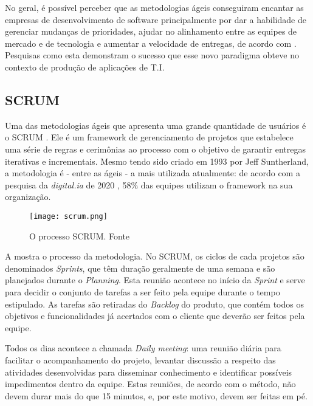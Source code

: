 No geral, é possível perceber que as metodologias ágeis conseguiram encantar as empresas de desenvolvimento de software principalmente por dar a habilidade de gerenciar mudanças de prioridades, ajudar no alinhamento entre as equipes de mercado e de tecnologia e aumentar a velocidade de entregas, de acordo com \cite{stateAgileReport2020}. Pesquisas como esta demonstram o sucesso que esse novo paradigma obteve no contexto de produção de aplicações de T.I. 

\vspace{3mm}
\subsection{SCRUM}
Uma das metodologias ágeis que apresenta uma grande quantidade de usuários é o SCRUM \cite{scrumBook}. Ele é um framework de gerenciamento de projetos que estabelece uma série de regras e cerimônias ao processo com o objetivo de garantir entregas iterativas e incrementais. Mesmo tendo sido criado em 1993 por Jeff Suntherland, a metodologia é - entre as ágeis - a mais utilizada atualmente: de acordo com a pesquisa da \emph{digital.ia} de 2020 \cite{stateAgileReport2020}, 58\% das equipes utilizam o framework na sua organização.

\begin{figure}[ht]
\begin{center}
\texttt{[image: scrum.png]}
\end{center}
\caption[O processo SCRUM]{
    O processo SCRUM. Fonte \cite{fotoScrum}
}\label{scrum}
\end{figure}

A  mostra o processo da metodologia. No SCRUM, os ciclos de cada projetos são denominados \emph{Sprints}, que têm duração geralmente de uma semana e são planejados durante o \emph{Planning}. Esta reunião acontece no início da \emph{Sprint} e serve para decidir o conjunto de tarefas a ser feito pela equipe durante o tempo estipulado. As tarefas são retiradas do \emph{Backlog} do produto, que contém todos os objetivos e funcionalidades já acertados com o cliente que deverão ser feitos pela equipe.

Todos os dias acontece a chamada \emph{Daily meeting}: uma reunião diária para facilitar o acompanhamento do projeto, levantar discussão a respeito das atividades desenvolvidas para disseminar conhecimento e identificar possíveis impedimentos dentro da equipe. Estas reuniões, de acordo com o método, não devem durar mais do que 15 minutos, e, por este motivo, devem ser feitas em pé.

